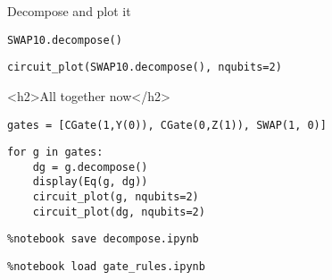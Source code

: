 Decompose and plot it

\begin{verbatim}
SWAP10.decompose()
\end{verbatim}

\begin{verbatim}
circuit_plot(SWAP10.decompose(), nqubits=2)
\end{verbatim}

<h2>All together now</h2>

\begin{verbatim}
gates = [CGate(1,Y(0)), CGate(0,Z(1)), SWAP(1, 0)]
\end{verbatim}

\begin{verbatim}
for g in gates:
    dg = g.decompose()
    display(Eq(g, dg))
    circuit_plot(g, nqubits=2)
    circuit_plot(dg, nqubits=2)    
\end{verbatim}

\begin{verbatim}
%notebook save decompose.ipynb
\end{verbatim}

\begin{verbatim}
%notebook load gate_rules.ipynb
\end{verbatim}

